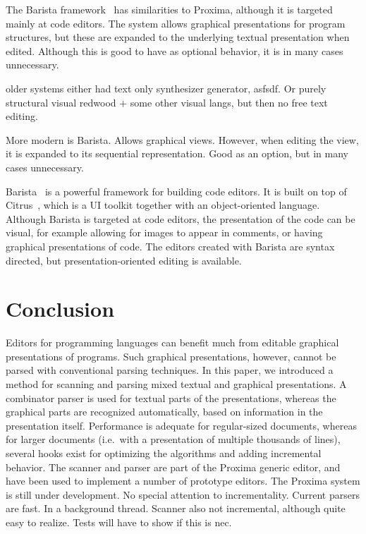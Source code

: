\documentclass{article}[10pt]
\begin{document}
The Barista framework~\cite{KoMyers06Barista} has similarities to Proxima, although it is targeted mainly at code editors. The system allows graphical presentations for program structures, but these are expanded to the underlying textual presentation when edited. Although this is good to have as optional behavior, it is in many cases unnecessary.

\bc
older systems either had text only synthesizer generator, asfsdf. Or purely structural visual redwood + some other visual langs, but then no free text editing.


More modern is Barista. Allows graphical views. However, when editing the view, it is expanded to its sequential representation. Good as an option, but in many cases unnecessary. 



\noindent Barista~\cite{KoMyers06Barista} is a powerful framework for building code editors. It is built on top of Citrus~\cite{KoMyers05Citrus}, which is a UI toolkit together with an object-oriented language. Although Barista is targeted at code editors, the presentation of the code can be visual, for example allowing for images to appear in comments, or having graphical presentations of code. The editors created with Barista are syntax directed, but presentation-oriented editing is available. 

\ec



%
\section{Conclusion}\label{sect:conclusion}
%


Editors for programming languages can benefit much from editable graphical presentations of programs. Such graphical presentations, however, cannot be parsed with conventional parsing techniques. In this paper, we introduced a method for scanning and parsing mixed textual and graphical presentations. A combinator parser is used for textual parts of the presentations, whereas the graphical parts are recognized automatically, based on information in the presentation itself. Performance is adequate for regular-sized documents, whereas for larger documents (i.e.\ with a presentation of multiple thousands of lines), several hooks exist for optimizing the algorithms and adding incremental behavior. The scanner and parser are part of the Proxima generic editor, and have been used to implement a number of prototype editors.
\bc
The Proxima system is still under development. No special attention to incrementality. Current parsers are fast. In a background thread. Scanner also not incremental, although quite easy to realize. Tests will have to show if this is nec.
\end{document}
